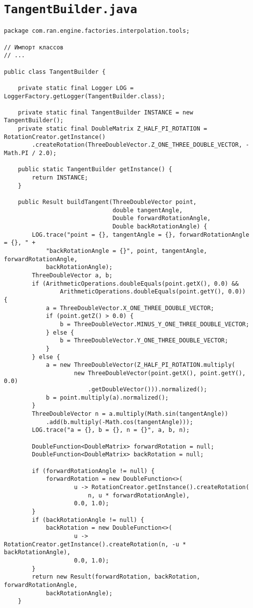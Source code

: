 \section*{\texttt{TangentBuilder.java}}
\begin{verbatim}
package com.ran.engine.factories.interpolation.tools;

// Импорт классов
// ...

public class TangentBuilder {

    private static final Logger LOG = LoggerFactory.getLogger(TangentBuilder.class);

    private static final TangentBuilder INSTANCE = new TangentBuilder();
    private static final DoubleMatrix Z_HALF_PI_ROTATION = RotationCreator.getInstance()
        .createRotation(ThreeDoubleVector.Z_ONE_THREE_DOUBLE_VECTOR, -Math.PI / 2.0);

    public static TangentBuilder getInstance() {
        return INSTANCE;
    }

    public Result buildTangent(ThreeDoubleVector point,
                               double tangentAngle,
                               Double forwardRotationAngle,
                               Double backRotationAngle) {
        LOG.trace("point = {}, tangentAngle = {}, forwardRotationAngle = {}, " +
            "backRotationAngle = {}", point, tangentAngle, forwardRotationAngle,
            backRotationAngle);
        ThreeDoubleVector a, b;
        if (ArithmeticOperations.doubleEquals(point.getX(), 0.0) &&
                ArithmeticOperations.doubleEquals(point.getY(), 0.0)) {
            a = ThreeDoubleVector.X_ONE_THREE_DOUBLE_VECTOR;
            if (point.getZ() > 0.0) {
                b = ThreeDoubleVector.MINUS_Y_ONE_THREE_DOUBLE_VECTOR;
            } else {
                b = ThreeDoubleVector.Y_ONE_THREE_DOUBLE_VECTOR;
            }
        } else {
            a = new ThreeDoubleVector(Z_HALF_PI_ROTATION.multiply(
                    new ThreeDoubleVector(point.getX(), point.getY(), 0.0)
                        .getDoubleVector())).normalized();
            b = point.multiply(a).normalized();
        }
        ThreeDoubleVector n = a.multiply(Math.sin(tangentAngle))
            .add(b.multiply(-Math.cos(tangentAngle)));
        LOG.trace("a = {}, b = {}, n = {}", a, b, n);

        DoubleFunction<DoubleMatrix> forwardRotation = null;
        DoubleFunction<DoubleMatrix> backRotation = null;

        if (forwardRotationAngle != null) {
            forwardRotation = new DoubleFunction<>(
                    u -> RotationCreator.getInstance().createRotation(
                        n, u * forwardRotationAngle),
                    0.0, 1.0);
        }
        if (backRotationAngle != null) {
            backRotation = new DoubleFunction<>(
                    u -> RotationCreator.getInstance().createRotation(n, -u * backRotationAngle),
                    0.0, 1.0);
        }
        return new Result(forwardRotation, backRotation, forwardRotationAngle,
            backRotationAngle);
    }


\end{verbatim}
